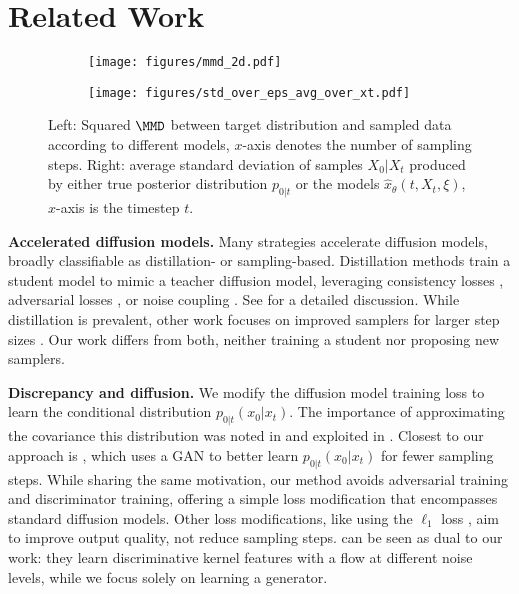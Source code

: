 \section{Related Work}
\label{sec:relatedWork}
\begin{figure}
    \centering
    \begin{subfigure}
        \centering
        \texttt{[image: figures/mmd\_2d.pdf]}
        \label{fig:2d_mmd}
    \end{subfigure}
    \hfill
    \begin{subfigure}
        \centering
        \texttt{[image: figures/std\_over\_eps\_avg\_over\_xt.pdf]}
        \label{fig:2d_stds}
    \end{subfigure}
    \caption{Left: Squared $\MMD$ between target distribution and sampled data according to different models, $x$-axis denotes the number of sampling steps. Right: average standard deviation of samples $X_0 | X_t$ produced by either true posterior distribution $p_{0 \vert t}$ or the models $\hat{x}_{\theta}(t,X_{t},\xi)$, $x$-axis is the timestep $t$.}
    \label{fig:2d_metrics}
\end{figure}

\textbf{Accelerated diffusion models.} Many strategies accelerate diffusion models, broadly classifiable as distillation- or sampling-based.  Distillation methods \citep{luhman2021knowledge,salimans2022progressive,luo2023comprehensive,salimans2024multistep,dieleman2024distillation,liu2022flow,meng2023distillation,song2023consistency,franceschi2024unifying,huang2024flow,sauer2025adversarial} train a student model to mimic a teacher diffusion model, leveraging consistency losses \cite{song2023consistency}, adversarial losses \citep{franceschi2024unifying,xu2024ufogen, sauer2025adversarial}, or noise coupling \cite{huang2024flow}. See \citep{dieleman2024distillation} for a detailed discussion.  While distillation is prevalent, other work focuses on improved samplers for larger step sizes \citep{jolicoeur2021gotta,lu2022dpm,zheng2023dpm}.  Our work differs from both, neither training a student nor proposing new samplers.

\textbf{Discrepancy and diffusion.} We modify the diffusion model training loss to learn the conditional distribution $p_{0|t}(x_0|x_t)$.  The importance of approximating the covariance this distribution was noted in \citep{nichol2021improved} and exploited in \citep{ho2020denoising,nichol2021improved,bao2022estimating,bao2022analytic,ou2024diffusion}.  Closest to our approach is \citep{xiao2021tackling}, which uses a GAN to better learn $p_{0|t}(x_0|x_t)$ for fewer sampling steps.  While sharing the same motivation, our method avoids adversarial training and discriminator training, offering a simple loss modification that encompasses standard diffusion models.  Other loss modifications, like using the $\ell_1$ loss \citep{chen2020wavegrad,saharia2022palette}, aim to improve output quality, not reduce sampling steps.  \citep{galashov2024deep} can be seen as dual to our work: they learn discriminative kernel features with a flow at different noise levels, while we focus solely on learning a generator.

